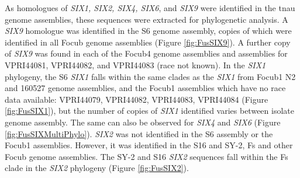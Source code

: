 As homologues of \textit{SIX1, SIX2, SIX4, SIX6}, and \textit{SIX9} were identified in the \ac{tnau} genome assemblies, these sequences were extracted for phylogenetic analysis.  A \textit{SIX9} homologue was identified in the S6 genome assembly, copies of which were identified in all \ac{Focub} genome assemblies (Figure \ref{fig:FusSIX9}). A further copy of \textit{SIX9} was found in each of the \ac{Focub4} genome assemblies and assemblies for VPRI44081, VPRI44082, and VPRI44083 (race not known). In the \textit{SIX1} phylogeny, the S6 \textit{SIX1} falls within the same clades as the \textit{SIX1} from \ac{Focub1} N2 and 160527 genome assemblies, and the \ac{Focub1} assemblies which have no race data available: VPRI44079, VPRI44082, VPRI44083, VPRI44084 (Figure \ref{fig:FusSIX1}), but the number of copies of \textit{SIX1} identified varies between isolate genome assembly. The same can also be observed for \textit{SIX4} and \textit{SIX6} (Figure \ref{fig:FusSIXMultiPhylo}). \textit{SIX2} was not identified in the S6 assembly or the \ac{Focub1} assemblies. However, it was identified in the S16 and SY-2, \ac{Fs} and other \ac{Focub} genome assemblies. The SY-2 and S16 \textit{SIX2} sequences fall within the \ac{Fs} clade in the \textit{SIX2} phylogeny (Figure \ref{fig:FusSIX2}).


